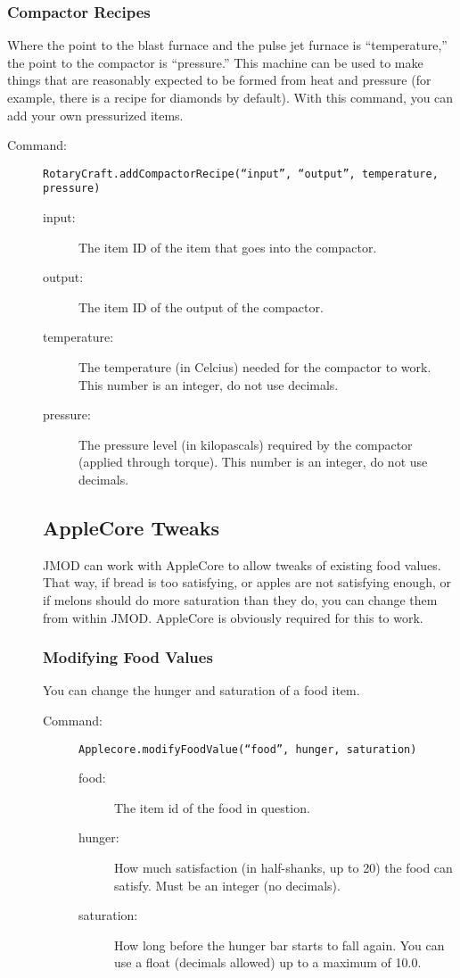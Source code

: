 \documentclass[letterpaper,titlepage,12pt]{article}
\begin{document}
\subsubsection{Compactor Recipes}

Where the point to the blast furnace and the pulse jet furnace is ``temperature,'' the point to the compactor is ``pressure.''  This machine can be used to make things that are reasonably expected to be formed from heat and pressure (for example, there is a recipe for diamonds by default).  With this command, you can add your own pressurized items.

\begin{description}
\item[Command:] \texttt{RotaryCraft.addCompactorRecipe(``input'', ``output'', temperature, pressure)}
\begin{description}
\item [input:] The item ID of the item that goes into the compactor.
\item [output:] The item ID of the output of the compactor.
\item [temperature:] The temperature (in Celcius) needed for the compactor to work.  This number is an integer, do not use decimals.
\item [pressure:] The pressure level (in kilopascals) required by the compactor (applied through torque).  This number is an integer, do not use decimals.
\end{description}

\subsection{AppleCore Tweaks}

JMOD can work with AppleCore to allow tweaks of existing food values.  That way, if bread is too satisfying, or apples are not satisfying enough, or if melons should do more saturation than they do, you can change them from within JMOD.  AppleCore is obviously required for this to work.

\subsubsection{Modifying Food Values}

You can change the hunger and saturation of a food item.

\begin{description}
\item[Command:] \texttt{Applecore.modifyFoodValue(``food'', hunger, saturation)}
\begin{description}
\item [food:] The item id of the food in question.
\item [hunger:] How much satisfaction (in half-shanks, up to 20) the food can satisfy.  Must be an integer (no decimals).
\item [saturation:] How long before the hunger bar starts to fall again.  You can use a float (decimals allowed) up to a maximum of 10.0.
\end{description}
\end{description}


\end{description}
\end{document}
